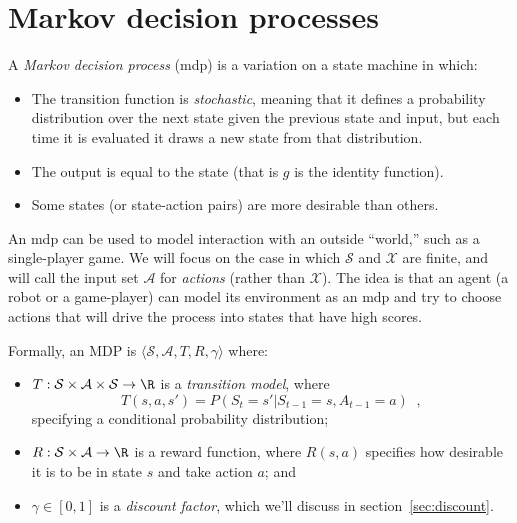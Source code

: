 \section{Markov decision processes}
\label{sec_mdps}

A {\em Markov decision process} ({\sc mdp}) is a variation on a state
machine in which:
\begin{itemize}
\item The transition function is {\em stochastic},
meaning that it defines a probability distribution over the  next
state given the previous state and input, but each time it is
evaluated it draws a new state from that distribution.
\item The output is equal to the state (that is $g$ is the identity
  function).  
\item Some states (or state-action pairs) are more desirable than others.
\end{itemize}

An {\sc mdp} can be used to model interaction with an outside
``world,'' such as a single-player  game.  We will focus on the case in which $\mathcal S$ and
$\mathcal X$ are finite, and will call the input set $\mathcal A$ for
{\em actions} (rather than $\mathcal X$).  The idea is that an agent
(a robot or a game-player) can model its environment as an {\sc mdp}
and try to choose actions that will drive the process into states that
have high scores.


Formally, an MDP is $\langle \mathcal S, \mathcal A, T, R,
\gamma\rangle$ where:
\begin{itemize}
\item
$T : \mathcal S \times \mathcal A \times \mathcal S \rightarrow \R$ is
a {\em transition model}, where
\[T(s, a, s') = P(S_t = s'|S_{t - 1} = s, 
A_{t - 1} = a)\;\;,\] specifying a conditional probability distribution; 
\item
$R: \mathcal S \times \mathcal A \rightarrow \R$ is a reward function,
where $R(s, a)$ specifies how desirable it is to be in  state $s$ and
take action $a$; and  
\item $\gamma \in [0, 1]$ is a {\em discount factor}, which we'll
  discuss in section~\ref{sec:discount}.
\end{itemize}

